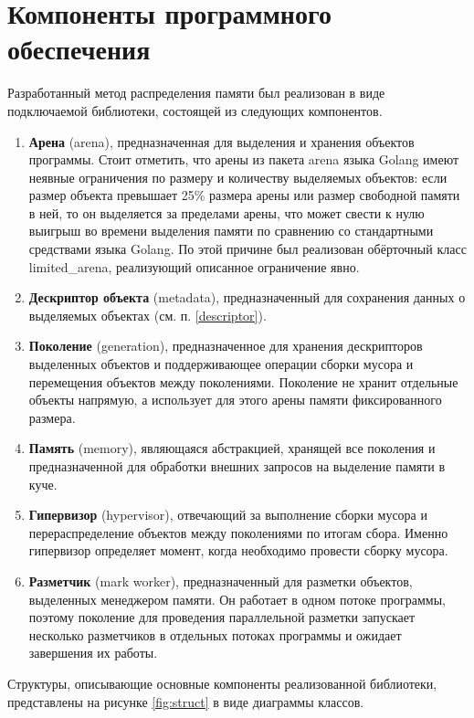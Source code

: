 \section{Компоненты программного обеспечения}

Разработанный метод распределения памяти был реализован в виде подключаемой библиотеки, состоящей из следующих компонентов.

\begin{enumerate}[label*=\arabic*.]
	\item \textbf{Арена} (arena), предназначенная для выделения и хранения объектов программы. Стоит отметить, что арены из пакета arena языка Golang имеют неявные ограничения по размеру и количеству выделяемых объектов: если размер объекта превышает 25\% размера арены или размер свободной памяти в ней, то он выделяется за пределами арены, что может свести к нулю выигрыш во времени выделения памяти по сравнению со стандартными средствами языка Golang. \cite{golang_arena_limits} По этой причине был реализован обёрточный класс limited\_arena, реализующий описанное ограничение явно. 
	\item \textbf{Дескриптор объекта} (metadata), предназначенный для сохранения данных о выделяемых объектах (см. п. \ref{descriptor}).
	\item \textbf{Поколение} (generation), предназначенное для хранения дескрипторов выделенных объектов и поддерживающее операции сборки мусора и перемещения объектов между поколениями. Поколение не хранит отдельные объекты напрямую, а использует для этого арены памяти фиксированного размера.
	\item \textbf{Память} (memory), являющаяся абстракцией, хранящей все поколения и предназначенной для обработки внешних запросов на выделение памяти в куче.
	\item \textbf{Гипервизор} (hypervisor), отвечающий за выполнение сборки мусора и перераспределение объектов между поколениями по итогам сбора. Именно гипервизор определяет момент, когда необходимо провести сборку мусора.
	\item \textbf{Разметчик} (mark worker), предназначенный для разметки объектов, выделенных менеджером памяти. Он работает в одном потоке программы, поэтому поколение для проведения параллельной разметки запускает несколько разметчиков в отдельных потоках программы и ожидает завершения их работы.
\end{enumerate}

Структуры, описывающие основные компоненты реализованной библиотеки, представлены на рисунке \ref{fig:struct} в виде диаграммы классов.

